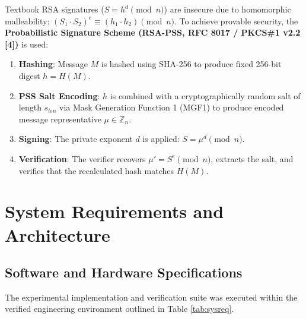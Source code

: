\documentclass[12pt,a4paper]{report}
\begin{document}
Textbook RSA signatures ($S = h^d \pmod n$) are insecure due to homomorphic malleability: $(S_1 \cdot S_2)^e \equiv (h_1 \cdot h_2) \pmod n$. To achieve provable security, the \textbf{Probabilistic Signature Scheme (RSA-PSS, RFC 8017 / PKCS\#1 v2.2 [4])} is used:
\begin{enumerate}
    \item \textbf{Hashing}: Message $M$ is hashed using SHA-256 to produce fixed 256-bit digest $h = H(M)$.
    \item \textbf{PSS Salt Encoding}: $h$ is combined with a cryptographically random salt of length $s_{len}$ via Mask Generation Function 1 (MGF1) to produce encoded message representative $\mu \in \mathbb{Z}_n$.
    \item \textbf{Signing}: The private exponent $d$ is applied: $S = \mu^d \pmod n$.
    \item \textbf{Verification}: The verifier recovers $\mu' = S^e \pmod n$, extracts the salt, and verifies that the recalculated hash matches $H(M)$.
\end{enumerate}

\newpage

\chapter{System Requirements and Architecture}

\section{Software and Hardware Specifications}
The experimental implementation and verification suite was executed within the verified engineering environment outlined in Table \ref{tab:sysreq}.
\end{document}
